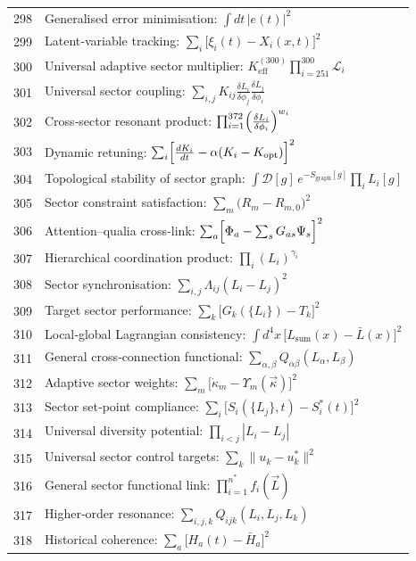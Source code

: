 \documentclass[12pt,a4paper]{article}
\begin{document}
\begin{longtable}{r l}
		298 & Generalised error minimisation: $\int dt\,|e(t)|^2$ \\
		299 & Latent‑variable tracking: $\sum_i\bigl[\xi_i(t) - X_i(x,t)\bigr]^2$ \\
		300 & Universal adaptive sector multiplier: $K^{(300)}_{\mathrm{eff}}\prod_{i=251}^{300}\mathcal{L}_i$ \\
		301 & Universal sector coupling: $\sum_{i,j}K_{ij}\frac{\delta L_i}{\delta\phi_j}\frac{\delta L_j}{\delta\phi_i}$ \\
		302 & Cross‑sector resonant product: $\prod_{i=1}^{372}\Bigl(\frac{\delta L_i}{\delta\phi_i}\Bigr)^{w_i}$ \\
		303 & Dynamic retuning: $\sum_i\Bigl[\frac{dK_i}{dt} - \alpha(K_i - K_{\text{opt}})\Bigr]^2$ \\
		304 & Topological stability of sector graph: $\int\mathcal{D}[g]\,e^{-S_{\text{graph}}[g]}\prod_i L_i[g]$ \\
		305 & Sector constraint satisfaction: $\sum_m\bigl(R_m - R_{m,0}\bigr)^2$ \\
		306 & Attention–qualia cross‑link: $\sum_a\Bigl[\Phi_a - \sum_s G_{as}\Psi_s\Bigr]^2$ \\
		307 & Hierarchical coordination product: $\prod_i(L_i)^{\gamma_i}$ \\
		308 & Sector synchronisation: $\sum_{i,j}\Lambda_{ij}(L_i - L_j)^2$ \\
		309 & Target sector performance: $\sum_k\bigl[G_k(\{L_i\}) - T_k\bigr]^2$ \\
		310 & Local‑global Lagrangian consistency: $\int d^4x\,\bigl[L_{\text{sum}}(x) - \bar L(x)\bigr]^2$ \\
		311 & General cross‑connection functional: $\sum_{\alpha,\beta}Q_{\alpha\beta}(L_\alpha,L_\beta)$ \\
		312 & Adaptive sector weights: $\sum_m\bigl[\dot\kappa_m - \Upsilon_m(\vec\kappa)\bigr]^2$ \\
		313 & Sector set‑point compliance: $\sum_i\bigl[S_i(\{L_j\},t) - S_i^*(t)\bigr]^2$ \\
		314 & Universal diversity potential: $\prod_{i<j}|L_i - L_j|$ \\
		315 & Universal sector control targets: $\sum_k\|u_k - u_k^*\|^2$ \\
		316 & General sector functional link: $\prod_{i=1}^{n^*}f_i(\vec L)$ \\
		317 & Higher‑order resonance: $\sum_{i,j,k}Q_{ijk}(L_i,L_j,L_k)$ \\
		318 & Historical coherence: $\sum_a\bigl[H_a(t) - \bar H_a\bigr]^2$ \\

\end{longtable}
\end{document}
